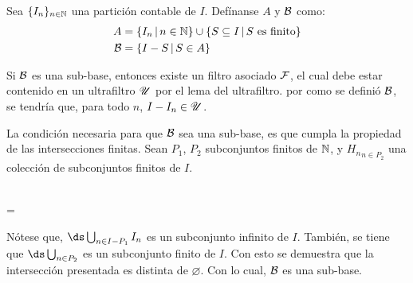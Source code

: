 \begin{demo}
  Sea $\{I_n\}_{n\in\mathbb{N}}$ una partición contable de $I$. Defínanse $A$ y $\mathcal{B}$
  como:
  \begin{align*}
    A &= \{I_n \,|\, n\in\mathbb{N}\} \cup \{S \subseteq I \,|\, S \text{ es finito}\}\\
    \mathcal{B} &= \{I - S \,|\, S \in A\}
  \end{align*}

  Si $\mathcal{B}$ es una sub-base, entonces existe un filtro asociado $\mathcal{F}$, el cual
  debe estar contenido en un ultrafiltro $\mathscr{U}$ por el lema del ultrafiltro. por
  como se definió $\mathcal{B}$, se tendría que, para todo $n$, $I-I_n\in\mathscr{U}$.

  La condición necesaria para que $\mathcal{B}$ sea una sub-base, es que cumpla la
  propiedad de las intersecciones finitas.
  Sean $P_1$, $P_2$ subconjuntos finitos de $\mathbb{N}$, y ${H_n}_{n\in P_2}$ una
  colección de subconjuntos finitos de $I$.

  \begin{longderivation}
      \\
    =\\
  \end{longderivation}

  Nótese que, $\ds\bigcup_{n\in I - P_1} I_n$ es un subconjunto infinito de $I$.
  También, se tiene que $\ds\bigcup_{n\in P_2}$ es un subconjunto finito de $I$.
  Con esto se demuestra que la intersección presentada es distinta de $\varnothing$.
  Con lo cual, $\mathcal{B}$ es una sub-base.
\end{demo}
